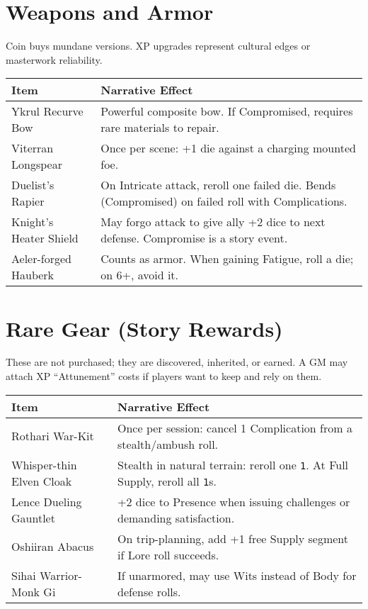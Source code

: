 \documentclass[12pt]{book}
\begin{document}
\section{Weapons and Armor}
Coin buys mundane versions. XP upgrades represent cultural edges or masterwork reliability.

\begin{tabularx}{\textwidth}{lX}
\textbf{Item} & \textbf{Narrative Effect} \\
\hline
Ykrul Recurve Bow & Powerful composite bow. If Compromised, requires rare materials to repair. \\
Viterran Longspear & Once per scene: +1 die against a charging mounted foe. \\
Duelist’s Rapier & On Intricate attack, reroll one failed die. Bends (Compromised) on failed roll with Complications. \\
Knight’s Heater Shield & May forgo attack to give ally +2 dice to next defense. Compromise is a story event. \\
Aeler-forged Hauberk & Counts as armor. When gaining Fatigue, roll a die; on 6+, avoid it. \\
\end{tabularx}

\section{Rare Gear (Story Rewards)}
These are not purchased; they are discovered, inherited, or earned.  
A GM may attach XP “Attunement” costs if players want to keep and rely on them.

\begin{tabularx}{\textwidth}{lX}
\textbf{Item} & \textbf{Narrative Effect} \\
\hline
Rothari War-Kit & Once per session: cancel 1 Complication from a stealth/ambush roll. \\
Whisper-thin Elven Cloak & Stealth in natural terrain: reroll one \texttt{1}. At Full Supply, reroll all \texttt{1}s. \\
Lence Dueling Gauntlet & +2 dice to Presence when issuing challenges or demanding satisfaction. \\
Oshiiran Abacus & On trip-planning, add +1 free Supply segment if Lore roll succeeds. \\
Sihai Warrior-Monk Gi & If unarmored, may use Wits instead of Body for defense rolls. \\
\end{tabularx}
\end{document}
